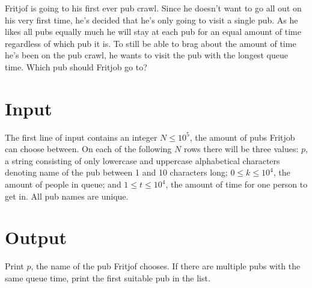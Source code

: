
Fritjof is going to his first ever pub crawl. Since he doesn't want to go all out on his very first
time, he's decided that he's only going to visit a single pub. As he likes all pubs equally much he
will stay at each pub for an equal amount of time regardless of which pub it is. To still be able to
brag about the amount of time he's been on the pub crawl, he wants to visit the pub with the longest
queue time. Which pub should Fritjob go to?

\section*{Input}

The first line of input contains an integer $N\leq 10^5$, the amount of pubs Fritjob can choose 
between. On each of the following $N$ rows there will be three values: $p$, a string consisting 
of only lowercase and uppercase alphabetical characters denoting name of the pub between 1 and 10 
characters long; $0\leq k\leq 10^4$, the amount of people in queue; and $1\leq t\leq 10^4$, 
the amount of time for one person to get in. All pub names are unique.

\section*{Output}

Print $p$, the name of the pub Fritjof chooses. If there are multiple pubs with the same queue time,
print the first suitable pub in the list.
